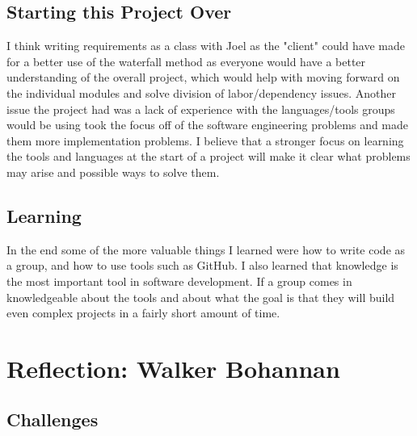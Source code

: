 \documentclass[a4paper]{article}
\begin{document}
\subsection{Starting this Project Over}
I think writing requirements as a class with Joel as the "client" could have made for a better use of the waterfall method as everyone would have a better understanding of the overall project, which would help with moving forward on the individual modules and solve division of labor/dependency issues. Another issue the project had was a lack of experience with the languages/tools groups would be using took the focus off of the software engineering problems and made them more implementation problems. I believe that a stronger focus on learning the tools and languages at the start of a project will make it clear what problems may arise and possible ways to solve them. 

\subsection{Learning}
In the end some of the more valuable things I learned were how to write code as a group, and how to use tools such as GitHub. I also learned that knowledge is the most important tool in software development.  If a group comes in knowledgeable about the tools and about what the goal is that they will build even complex projects in a fairly short amount of time.

\section{Reflection: Walker Bohannan}
\subsection{Challenges}
		
\end{document}
